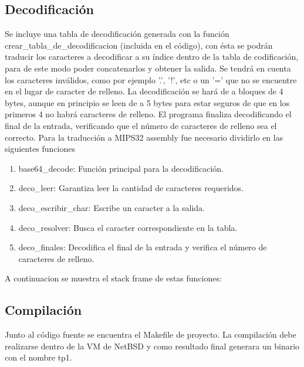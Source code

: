 \documentclass[a4paper,11pt, margin=1in]{article}
\begin{document}
	

\subsection{Decodificación}
Se incluye una tabla de decodificación generada con la función crear\_tabla\_de\_decodificacion (incluida en el código), 
con ésta se podrán traducir los caracteres a decodificar a su índice dentro de la tabla de codificación, 
para de este modo poder concatenarlos y obtener la salida. Se tendrá en cuenta los caracteres inválidos, 
como por ejemplo '.', '!', etc o un '=' que no se encuentre en el lugar de caracter de relleno.
La decodificación se hará de a bloques de 4 bytes, aunque en principio se leen de a 5 bytes para estar 
seguros de que en los primeros 4 no habrá caracteres de relleno. 
El programa finaliza decodificando el final de la entrada, verificando que el número de caracteres de relleno 
sea el correcto.
\newline
Para la traducción a MIPS32 assembly fue necesario dividirlo en las siguientes funciones
\begin{enumerate}

\item base64\_decode: Función principal para la decodificación.
\item deco\_leer: Garantiza leer la cantidad de caracteres requeridos.
\item deco\_escribir\_char: Escribe un caracter a la salida.
\item deco\_resolver: Busca el caracter correspondiente en la tabla.
\item deco\_finales: Decodifica el final de la entrada y verifica el número de caracteres de relleno.

\end{enumerate}
A continuacion se muestra el stack frame de estas funciones:
\newline

	


\subsection{Compilación}
Junto al código fuente se encuentra el Makefile de proyecto. La compilación debe realizarse dentro de la VM de NetBSD y
como resultado final generara un binario con el nombre tp1.
\end{document}

